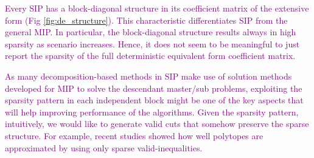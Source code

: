\textcolor{purple}{Every SIP has a block-diagonal structure in its coefficient matrix of the extensive form (Fig \ref{fig:de_structure}). This characteristic differentiates SIP from the general MIP. In particular, the block-diagonal structure results always in high sparsity as scenario increases. Hence, it does not seem to be meaningful to just report the sparsity of the full deterministic equivalent form coefficient matrix.}


\textcolor{purple}{As many decomposition-based methods in SIP make use of solution methods developed for MIP to solve the descendant master/sub problems, exploiting the sparsity pattern in each independent block might be one of the key aspects that will help improving performance of the algorithms. Given the sparsity pattern, intuitively, we would like to generate valid cuts that somehow preserve the sparse structure. For example, recent studies \cite{DMW2015,DIM2015} showed how well polytopes are approximated by using only sparse valid-inequalities. }













